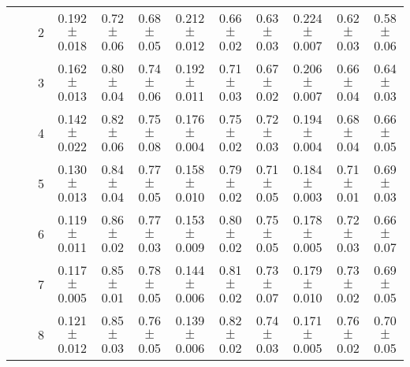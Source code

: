 \begin{table*}
{\begin{tabular}{|l|c|c||c|c|c||c|c|c||c|c|c|}
 & & 2 & \textcolor{gate_color}{0.192$\pm$0.018} & \textcolor{gate_color}{0.72$\pm$0.06} & \textcolor{gate_color}{0.68$\pm$0.05} & \textcolor{mixed_color}{0.212$\pm$0.012} & \textcolor{mixed_color}{0.66$\pm$0.02} & \textcolor{mixed_color}{0.63$\pm$0.03} & \textcolor{pulsed_color}{0.224$\pm$0.007} & \textcolor{pulsed_color}{0.62$\pm$0.03} & \textcolor{pulsed_color}{0.58$\pm$0.06} \\
 & & 3 & \textcolor{gate_color}{0.162$\pm$0.013} & \textcolor{gate_color}{0.80$\pm$0.04} & \textcolor{gate_color}{0.74$\pm$0.06} & \textcolor{mixed_color}{0.192$\pm$0.011} & \textcolor{mixed_color}{0.71$\pm$0.03} & \textcolor{mixed_color}{0.67$\pm$0.02} & \textcolor{pulsed_color}{0.206$\pm$0.007} & \textcolor{pulsed_color}{0.66$\pm$0.04} & \textcolor{pulsed_color}{0.64$\pm$0.03} \\
 & & 4 & \textcolor{gate_color}{0.142$\pm$0.022} & \textcolor{gate_color}{0.82$\pm$0.06} & \textcolor{gate_color}{0.75$\pm$0.08} & \textcolor{mixed_color}{0.176$\pm$0.004} & \textcolor{mixed_color}{0.75$\pm$0.02} & \textcolor{mixed_color}{0.72$\pm$0.03} & \textcolor{pulsed_color}{0.194$\pm$0.004} & \textcolor{pulsed_color}{0.68$\pm$0.04} & \textcolor{pulsed_color}{0.66$\pm$0.05} \\
 & & 5 & \textcolor{gate_color}{0.130$\pm$0.013} & \textcolor{gate_color}{0.84$\pm$0.04} & \textcolor{gate_color}{0.77$\pm$0.05} & \textcolor{mixed_color}{0.158$\pm$0.010} & \textcolor{mixed_color}{0.79$\pm$0.02} & \textcolor{mixed_color}{0.71$\pm$0.05} & \textcolor{pulsed_color}{0.184$\pm$0.003} & \textcolor{pulsed_color}{0.71$\pm$0.01} & \textcolor{pulsed_color}{0.69$\pm$0.03} \\
 & & 6 & \textcolor{gate_color}{0.119$\pm$0.011} & \textcolor{gate_color}{0.86$\pm$0.02} & \textcolor{gate_color}{0.77$\pm$0.03} & \textcolor{mixed_color}{0.153$\pm$0.009} & \textcolor{mixed_color}{0.80$\pm$0.02} & \textcolor{mixed_color}{0.75$\pm$0.05} & \textcolor{pulsed_color}{0.178$\pm$0.005} & \textcolor{pulsed_color}{0.72$\pm$0.03} & \textcolor{pulsed_color}{0.66$\pm$0.07} \\
 & & 7 & \textcolor{gate_color}{0.117$\pm$0.005} & \textcolor{gate_color}{0.85$\pm$0.01} & \textcolor{gate_color}{0.78$\pm$0.05} & \textcolor{mixed_color}{0.144$\pm$0.006} & \textcolor{mixed_color}{0.81$\pm$0.02} & \textcolor{mixed_color}{0.73$\pm$0.07} & \textcolor{pulsed_color}{0.179$\pm$0.010} & \textcolor{pulsed_color}{0.73$\pm$0.02} & \textcolor{pulsed_color}{0.69$\pm$0.05} \\
 & & 8 & \textcolor{gate_color}{0.121$\pm$0.012} & \textcolor{gate_color}{0.85$\pm$0.03} & \textcolor{gate_color}{0.76$\pm$0.05} & \textcolor{mixed_color}{0.139$\pm$0.006} & \textcolor{mixed_color}{0.82$\pm$0.02} & \textcolor{mixed_color}{0.74$\pm$0.03} & \textcolor{pulsed_color}{0.171$\pm$0.005} & \textcolor{pulsed_color}{0.76$\pm$0.02} & \textcolor{pulsed_color}{0.70$\pm$0.05} \\

\end{tabular}}
\end{table*}
